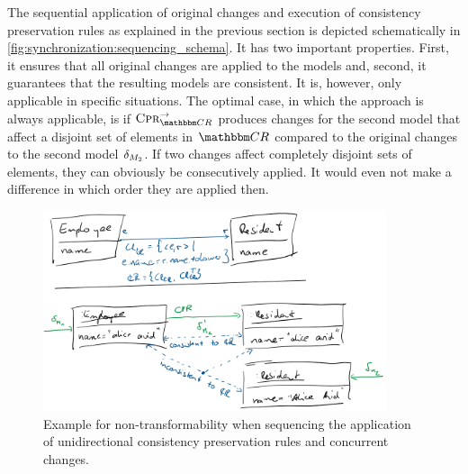 The sequential application of original changes and execution of consistency preservation rules as explained in the previous section is depicted schematically in \autoref{fig:synchronization:sequencing_schema}.
It has two important properties. 
First, it ensures that all original changes are applied to the models and, second, it guarantees that the resulting models are consistent.
It is, however, only applicable in specific situations.
The optimal case, in which the approach is always applicable, is if $\consistencypreservationrule{\consistencyrelationset{CR}}^{\rightarrow}$ produces changes for the second model that affect a disjoint set of elements in $\consistencyrelationset{CR}$ compared to the original changes to the second model $\change{\metamodel{M}{2}}$.
If two changes affect completely disjoint sets of elements, they can obviously be consecutively applied.
It would even not make a difference in which order they are applied then.

\begin{figure}
    \centering
    \includegraphics[width=0.9\textwidth]{figures/correctness/synchronization/non_transformability.png}
    \caption[Non-transformability in sequencing scenario]{Example for non-transformability when sequencing the application of unidirectional consistency preservation rules and concurrent changes.}
    \label{fig:synchronization:non_transformability}
\end{figure}

